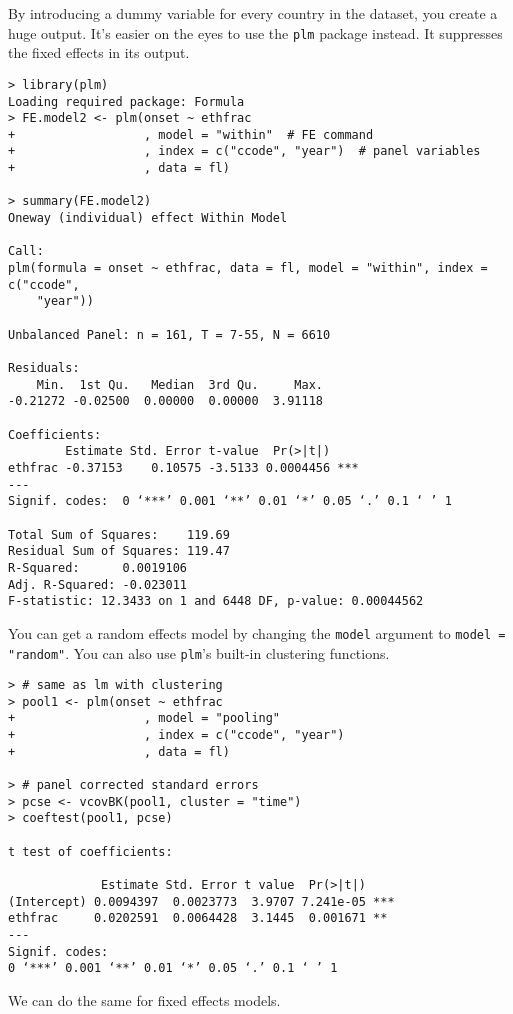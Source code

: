 By introducing a dummy variable for every country in the dataset, you create a huge output. It's easier on the eyes to use the \texttt{plm} package instead. It suppresses the fixed effects in its output.

\begin{lstlisting}
> library(plm)
Loading required package: Formula
> FE.model2 <- plm(onset ~ ethfrac
+                  , model = "within"  # FE command
+                  , index = c("ccode", "year")  # panel variables
+                  , data = fl)

> summary(FE.model2)
Oneway (individual) effect Within Model

Call:
plm(formula = onset ~ ethfrac, data = fl, model = "within", index = c("ccode", 
    "year"))

Unbalanced Panel: n = 161, T = 7-55, N = 6610

Residuals:
    Min.  1st Qu.   Median  3rd Qu.     Max. 
-0.21272 -0.02500  0.00000  0.00000  3.91118 

Coefficients:
        Estimate Std. Error t-value  Pr(>|t|)    
ethfrac -0.37153    0.10575 -3.5133 0.0004456 ***
---
Signif. codes:  0 ‘***’ 0.001 ‘**’ 0.01 ‘*’ 0.05 ‘.’ 0.1 ‘ ’ 1

Total Sum of Squares:    119.69
Residual Sum of Squares: 119.47
R-Squared:      0.0019106
Adj. R-Squared: -0.023011
F-statistic: 12.3433 on 1 and 6448 DF, p-value: 0.00044562
\end{lstlisting}

You can get a random effects model by changing the \texttt{model} argument to \texttt{model = "random"}. You can also use \texttt{plm}'s built-in clustering functions.

\begin{lstlisting}
> # same as lm with clustering
> pool1 <- plm(onset ~ ethfrac
+                  , model = "pooling" 
+                  , index = c("ccode", "year") 
+                  , data = fl)

> # panel corrected standard errors
> pcse <- vcovBK(pool1, cluster = "time")
> coeftest(pool1, pcse)

t test of coefficients:

             Estimate Std. Error t value  Pr(>|t|)    
(Intercept) 0.0094397  0.0023773  3.9707 7.241e-05 ***
ethfrac     0.0202591  0.0064428  3.1445  0.001671 ** 
---
Signif. codes:  
0 ‘***’ 0.001 ‘**’ 0.01 ‘*’ 0.05 ‘.’ 0.1 ‘ ’ 1
\end{lstlisting}

We can do the same for fixed effects models.

